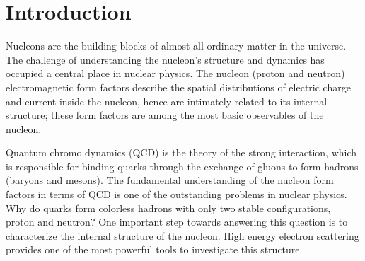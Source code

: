 \section{Introduction} 

Nucleons are the building blocks of almost all ordinary matter in the universe. The challenge of understanding the nucleon's
 structure and dynamics has occupied a central place in nuclear physics. The nucleon (proton and neutron) electromagnetic
 form factors describe the spatial distributions of electric charge and current inside
 the nucleon, hence are intimately related to its internal structure; these form factors are among the most basic observables of the
 nucleon.

Quantum chromo dynamics (QCD) is the theory of the strong interaction, which is responsible for binding quarks through the exchange of
gluons to form  hadrons (baryons and mesons). The fundamental understanding of the nucleon form factors in terms of QCD is one of
 the outstanding  problems in nuclear physics. Why do quarks form colorless hadrons with only two stable configurations, proton and neutron?
 One important step towards answering this question is to characterize the internal structure of the nucleon. High energy
 electron scattering provides one of the most powerful tools to investigate this structure. 

